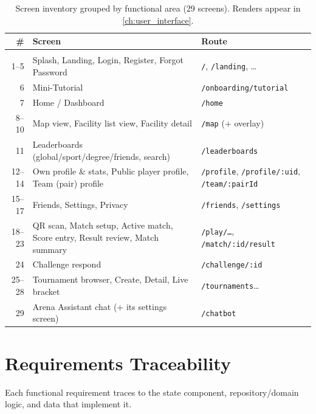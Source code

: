 \documentclass{configurations/polimi3i_thesis}
\renewcommand{\_}{\textunderscore\allowbreak}
\begin{document}
\begin{table}[H]
    \centering
    \small
    \begin{tabularx}{\textwidth}{r X l}
        \# & \textbf{Screen} & \textbf{Route} \\\hline\\[-9px]
        1--5   & Splash, Landing, Login, Register, Forgot Password & \texttt{/}, \texttt{/landing}, \ldots \\[2px]
        6      & Mini-Tutorial & \texttt{/onboarding/tutorial} \\[2px]
        7      & Home / Dashboard & \texttt{/home} \\[2px]
        8--10  & Map view, Facility list view, Facility detail & \texttt{/map} (+ overlay) \\[2px]
        11     & Leaderboards (global/sport/degree/friends, search) & \texttt{/leaderboards} \\[2px]
        12--14 & Own profile \& stats, Public player profile, Team (pair) profile & \texttt{/profile}, \texttt{/profile/:uid}, \texttt{/team/:pairId} \\[2px]
        15--17 & Friends, Settings, Privacy & \texttt{/friends}, \texttt{/settings} \\[2px]
        18--23 & QR scan, Match setup, Active match, Score entry, Result review, Match summary & \texttt{/play/\dots}, \texttt{/match/:id/result} \\[2px]
        24     & Challenge respond & \texttt{/challenge/:id} \\[2px]
        25--28 & Tournament browser, Create, Detail, Live bracket & \texttt{/tournaments}\ldots \\[2px]
        29     & Arena Assistant chat (+ its settings screen) & \texttt{/chatbot} \\[2px]
    \end{tabularx}
    \caption{Screen inventory grouped by functional area (29 screens). Renders appear in \cref{ch:user_interface}.}
    \label{tab:screen_inventory}
\end{table}

\section{Requirements Traceability}
\label{sec:traceability}

Each functional requirement traces to the state component, repository/domain logic, and data that implement it.
\end{document}
